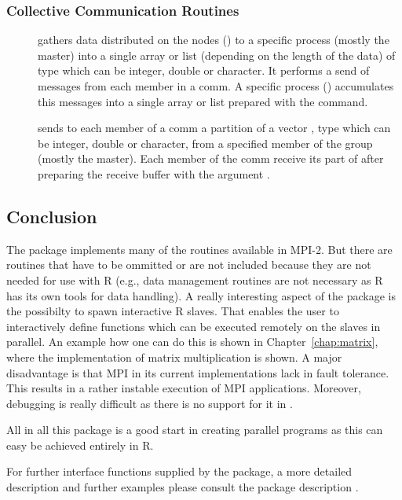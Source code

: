 \subsubsection{Collective Communication Routines}
\begin{description}
\item[] gathers
  data distributed on the nodes () to a 
  specific process (mostly the master) into a single array or list
  (depending on the length of the data) of type  which can
  be integer, double or character. It
  performs  
  a send of messages from each member in a comm. A
  specific process () accumulates this messages into a 
  single array or list prepared with the  command.
\item[]
  sends to each member of a comm a partition of  a vector ,
  type  which can be integer, double or character,
  from a specified member of the group (mostly the master). Each
  member of the comm receive its part of  after preparing the
  receive buffer with the argument .
\end{description}

\subsection{Conclusion}

The package  implements many of the routines available in
MPI-2. But there are routines that have to be ommitted or are not included
because they are not needed for use with R (e.g., data management
routines are not necessary as R has its own tools for data handling).
A really interesting aspect of the  package is the
possibilty to spawn interactive R slaves. That enables the user to
interactively 
define functions which can be executed remotely on the slaves in
parallel. An example how one can do this is shown in
Chapter~\ref{chap:matrix}, where the implementation of matrix
multiplication is shown. A major disadvantage is that MPI in its
current implementations lack in fault tolerance. This results in a
rather instable execution of MPI applications. Moreover, debugging
is really difficult as there is no support for it in .

All in all this package is a good start in creating parallel programs
as this can easy be achieved entirely in R.

For further interface functions supplied by the  package, a
more detailed description and further examples please consult the
package description \cite{yu06Rmpi}.
